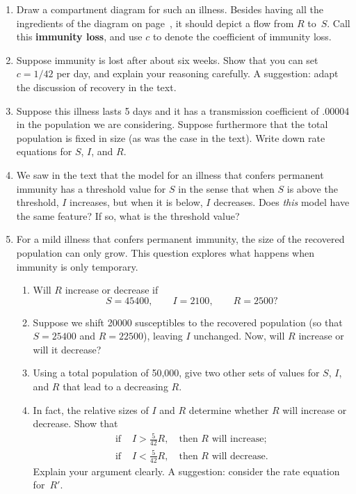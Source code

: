 \begin{enumerate}
\item Draw a compartment diagram for such an illness.  Besides having
all the ingredients of the diagram on page~\pageref{`diagram'}, it
should depict a flow from $R$ to~$S$.  Call this {\bf immunity
  loss}, and use $c$ to denote the coefficient of
immunity loss.


\item Suppose immunity is lost after about six weeks.  Show that you
can set $c = 1/42$ per day, and explain your reasoning carefully.  A
suggestion: adapt the discussion of recovery in the text.


\item Suppose this illness lasts 5 days and it has a transmission
coefficient of .00004 in the population we are considering.  Suppose
furthermore that the total population is fixed in size (as was the
case in the text).  Write down rate equations for $S$, $I$, and $R$.


\item We saw in the text that the model for an illness that confers
permanent immunity has a threshold value for $S$ in the sense that
when $S$ is above the threshold, $I$ increases, but when it is below,
$I$ decreases.  Does {\em this\/} model have the same feature?  If so,
what is the threshold value?


\item For a mild illness that confers permanent immunity, the size of
the recovered population can only grow.  This question explores what
happens when immunity is only temporary.

  \begin{enumerate}
  \item Will $R$ increase or decrease if
\[
S = 45400, \qquad I = 2100, \qquad R = 2500?
\]


  \item Suppose we shift 20000 susceptibles to the recovered population
(so that $S = 25400$ and $R = 22500$), leaving $I$ unchanged.  Now,
will $R$ increase or will it decrease?

  \item Using a total population of 50,000, give two other sets of values
for $S$, $I$, and $R$ that lead to a decreasing $R$.

  \item In fact, the relative sizes of $I$ and $R$ determine whether $R$
will increase or decrease.  Show that
\begin{align*}
\text{if } & I > \tfrac{5}{42} R, \quad 
		\text{then $R$ will increase;} \\
\text{if } & I < \tfrac{5}{42} R,  \quad
		\text{then $R$ will decrease.} 
\end{align*}
Explain your argument clearly.  A suggestion: consider the rate
equation for~$R'$.



\end{enumerate}
\end{enumerate}
